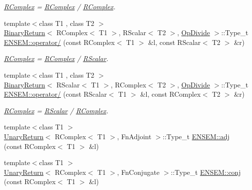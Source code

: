\begin{DoxyCompactItemize}
\begin{DoxyCompactList}\small\item\em \mbox{\hyperlink{classENSEM_1_1RComplex}{R\+Complex}} = \mbox{\hyperlink{classENSEM_1_1RComplex}{R\+Complex}} / \mbox{\hyperlink{classENSEM_1_1RComplex}{R\+Complex}}. \end{DoxyCompactList}\item 
{\footnotesize template$<$class T1 , class T2 $>$ }\\\mbox{\hyperlink{structBinaryReturn}{Binary\+Return}}$<$ R\+Complex$<$ T1 $>$, R\+Scalar$<$ T2 $>$, \mbox{\hyperlink{structOpDivide}{Op\+Divide}} $>$\+::Type\+\_\+t \mbox{\hyperlink{group__rcomplex_ga249a0c4eb26560012c5090b615fadf26}{E\+N\+S\+E\+M\+::operator/}} (const R\+Complex$<$ T1 $>$ \&l, const R\+Scalar$<$ T2 $>$ \&r)
\begin{DoxyCompactList}\small\item\em \mbox{\hyperlink{classENSEM_1_1RComplex}{R\+Complex}} = \mbox{\hyperlink{classENSEM_1_1RComplex}{R\+Complex}} / \mbox{\hyperlink{classENSEM_1_1RScalar}{R\+Scalar}}. \end{DoxyCompactList}\item 
{\footnotesize template$<$class T1 , class T2 $>$ }\\\mbox{\hyperlink{structBinaryReturn}{Binary\+Return}}$<$ R\+Scalar$<$ T1 $>$, R\+Complex$<$ T2 $>$, \mbox{\hyperlink{structOpDivide}{Op\+Divide}} $>$\+::Type\+\_\+t \mbox{\hyperlink{group__rcomplex_gacaba74ac4d092284f9b979ce552b8beb}{E\+N\+S\+E\+M\+::operator/}} (const R\+Scalar$<$ T1 $>$ \&l, const R\+Complex$<$ T2 $>$ \&r)
\begin{DoxyCompactList}\small\item\em \mbox{\hyperlink{classENSEM_1_1RComplex}{R\+Complex}} = \mbox{\hyperlink{classENSEM_1_1RScalar}{R\+Scalar}} / \mbox{\hyperlink{classENSEM_1_1RComplex}{R\+Complex}}. \end{DoxyCompactList}\item 
{\footnotesize template$<$class T1 $>$ }\\\mbox{\hyperlink{structUnaryReturn}{Unary\+Return}}$<$ R\+Complex$<$ T1 $>$, Fn\+Adjoint $>$\+::Type\+\_\+t \mbox{\hyperlink{group__rcomplex_ga4cb16a1d0f8f130aeb4daf0967a43c7e}{E\+N\+S\+E\+M\+::adj}} (const R\+Complex$<$ T1 $>$ \&l)
\item 
{\footnotesize template$<$class T1 $>$ }\\\mbox{\hyperlink{structUnaryReturn}{Unary\+Return}}$<$ R\+Complex$<$ T1 $>$, Fn\+Conjugate $>$\+::Type\+\_\+t \mbox{\hyperlink{group__rcomplex_gaa21f7147b1663d93c675ea24647c9158}{E\+N\+S\+E\+M\+::conj}} (const R\+Complex$<$ T1 $>$ \&l)

\end{DoxyCompactItemize}
